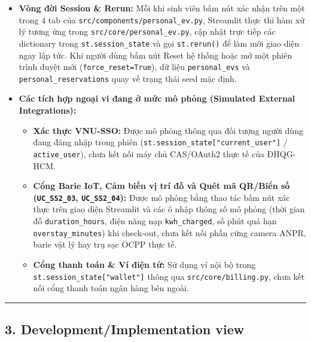 \documentclass[11pt,a4paper]{article}
\providecommand{\tightlist}{%
  \setlength{\itemsep}{0pt}\setlength{\parskip}{0pt}}
\begin{document}
\begin{itemize}
\tightlist
\item
  \textbf{Vòng đời Session \& Rerun:} Mỗi khi sinh viên bấm nút xác nhận
  trên một trong 4 tab của \texttt{src/components/personal\_ev.py},
  Streamlit thực thi hàm xử lý tương ứng trong
  \texttt{src/core/personal\_ev.py}, cập nhật trực tiếp các dictionary
  trong \texttt{st.session\_state} và gọi \texttt{st.rerun()} để làm mới
  giao diện ngay lập tức. Khi người dùng bấm nút Reset hệ thống hoặc mở
  một phiên trình duyệt mới (\texttt{force\_reset=True}), dữ liệu
  \texttt{personal\_evs} và \texttt{personal\_reservations} quay về
  trạng thái seed mặc định.
\item
  \textbf{Các tích hợp ngoại vi đang ở mức mô phỏng (Simulated External
  Integrations):}

  \begin{itemize}
  \tightlist
  \item
    \textbf{Xác thực VNU-SSO:} Được mô phỏng thông qua đối tượng người
    dùng đang đăng nhập trong phiên
    (\texttt{st.session\_state{[}"current\_user"{]}} /
    \texttt{active\_user}), chưa kết nối máy chủ CAS/OAuth2 thực tế của
    ĐHQG-HCM.
  \item
    \textbf{Cổng Barie IoT, Cảm biến vị trí đỗ và Quét mã QR/Biển số
    (\texttt{UC\_SS2\_03}, \texttt{UC\_SS2\_04}):} Được mô phỏng bằng
    thao tác bấm nút xác thực trên giao diện Streamlit và các ô nhập
    thông số mô phỏng (thời gian đỗ \texttt{duration\_hours}, điện năng
    nạp \texttt{kwh\_charged}, số phút quá hạn
    \texttt{overstay\_minutes}) khi check-out, chưa kết nối phần cứng
    camera ANPR, barie vật lý hay trụ sạc OCPP thực tế.
  \item
    \textbf{Cổng thanh toán \& Ví điện tử:} Sử dụng ví nội bộ trong
    \texttt{st.session\_state{[}"wallet"{]}} thông qua
    \texttt{src/core/billing.py}, chưa kết nối cổng thanh toán ngân hàng
    bên ngoài.
  \end{itemize}
\end{itemize}

\begin{center}\rule{0.5\linewidth}{0.5pt}\end{center}

\hypertarget{developmentimplementation-view}{%
\subsection{3. Development/Implementation
view}\label{developmentimplementation-view}}
\end{document}
